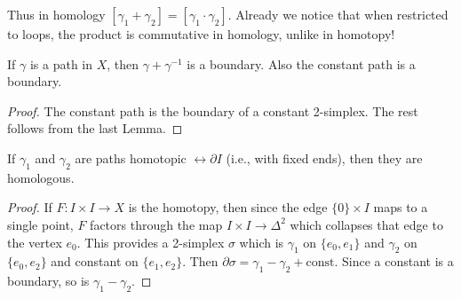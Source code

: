 Thus in homology $[\gamma_1+\gamma_2]=[\gamma_1\cdot\gamma_2]$. Already we notice that when restricted to loops, the product is commutative in homology, unlike in homotopy!

\begin{lem}
    If $\gamma$ is a path in $X$, then $\gamma+\gamma^{-1}$ is a boundary. Also the constant path is a boundary.
\end{lem}
\begin{proof}
     The constant path is the boundary of a constant 2-simplex. The rest follows from the last Lemma.
\end{proof}

\begin{lem}
    If $\gamma_1$ and $\gamma_2$ are paths homotopic $\rel \partial I$ (i.e., with fixed ends), then they are homologous.
\end{lem}
\begin{proof}
     If $F:I\times I\to X$ is the homotopy, then since the edge $\{0\}\times I$ maps to a single point, $F$ factors through the map $I\times I\to \Delta^2$ which collapses that edge to the vertex $e_0$. This provides a 2-simplex $\sigma$ which is $\gamma_1$ on $\{e_0,e_1\}$ and $\gamma_2$ on $\{e_0,e_2\}$ and constant on $\{e_1,e_2\}$. Then $\partial\sigma=\gamma_1-\gamma_2+\text{const}$. Since a constant is a boundary, so is $\gamma_1-\gamma_2$.
\end{proof}

